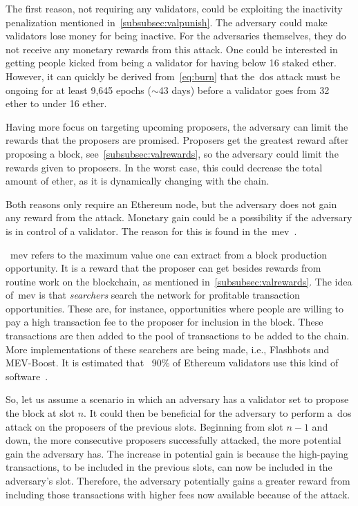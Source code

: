 The first reason, not requiring any validators, could be exploiting the inactivity penalization mentioned in~\autoref{subsubsec:valpunish}.
The adversary could make validators lose money for being inactive.
For the adversaries themselves, they do not receive any monetary rewards from this attack.
One could be interested in getting people kicked from being a validator for having below 16 staked ether.
However, it can quickly be derived from~\autoref{eq:burn} that the~\gls{dos} attack must be ongoing for at least 9,645 epochs ($\sim$43 days) before a validator goes from 32 ether to under 16 ether.


Having more focus on targeting upcoming proposers, the adversary can limit the rewards that the proposers are promised.
Proposers get the greatest reward after proposing a block, see~\autoref{subsubsec:valrewards}, so the adversary could limit the rewards given to proposers.
In the worst case, this could decrease the total amount of ether, as it is dynamically changing with the chain.


Both reasons only require an Ethereum node, but the adversary does not gain any reward from the attack.
Monetary gain could be a possibility if the adversary is in control of a validator.
The reason for this is found in the~\gls{mev}~\cite{mev}.

~\gls{mev} refers to the maximum value one can extract from a block production opportunity.
It is a reward that the proposer can get besides rewards from routine work on the blockchain, as mentioned in~\autoref{subsubsec:valrewards}.
The idea of~\gls{mev} is that \textit{searchers} search the network for profitable transaction opportunities.
These are, for instance, opportunities where people are willing to pay a high transaction fee to the proposer for inclusion in the block.
These transactions are then added to the pool of transactions to be added to the chain.
More implementations of these searchers are being made, i.e., Flashbots and MEV-Boost.
It is estimated that ~90\% of Ethereum validators use this kind of software~\cite{cryptoeprint:2023/760}.

So, let us assume a scenario in which an adversary has a validator set to propose the block at slot $n$.
It could then be beneficial for the adversary to perform a~\gls{dos} attack on the proposers of the previous slots.
Beginning from slot $n-1$ and down, the more consecutive proposers successfully attacked, the more potential gain the adversary has.
The increase in potential gain is because the high-paying transactions, to be included in the previous slots, can now be included in the adversary's slot.
Therefore, the adversary potentially gains a greater reward from including those transactions with higher fees now available because of the attack.



